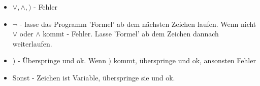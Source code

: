 \documentclass[a4paper]{scrartcl}
\begin{document}
\begin{itemize}
\item $\vee, \wedge, )$ - Fehler
\item $\neg$ - lasse das Programm 'Formel' ab dem nächsten Zeichen laufen. Wenn nicht $\vee$ oder $\wedge$ kommt - Fehler. Lasse 'Formel' ab dem Zeichen dannach weiterlaufen.
\item $)$ - Überspringe und ok. Wenn $)$ kommt, überspringe und ok, ansonsten Fehler
\item Sonst - Zeichen ist Variable, überspringe sie und ok.
\end{itemize} 
\end{document}
